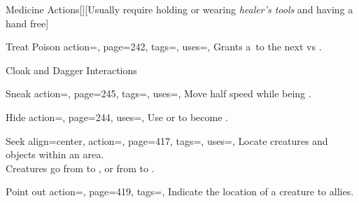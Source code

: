 \begin{PageBackLandscape}
\begin{TablesHalf}{\backTableHeight}
\begin{Table}{Medicine Actions}[][\quad Usually require holding or wearing \textit{healer's tools} and having
        a hand
        free]
            \begin{entry}{Treat Poison}{%
                action=,
                page=242,
                tags=\Manipulate,
                uses={\Medicine[tags={T}]},
            }
                Grants a \,\Cirm to the next  vs .\hfill
            \end{entry}
        \end{Table}
        \TableSpace
        \begin{Table}{Cloak and Dagger Interactions}
            \begin{entry}{Sneak}{%
                action=,
                page=245,
                tags=\Move,
                uses={\Stealth[tags={S}]},
            }
                Move half speed while being \Undetected. \hfill{}\quad
            \end{entry}
            \begin{entry}{Hide}{%
                action=,
                page=244,
                uses={\Stealth[tags={S}]},
            }
                Use  or  to become \Hidden. \hfill
            \end{entry}
            \breakLine
            \begin{entry}{Seek}{%
                align=center,
                action=,
                page=417,
                tags=\Concentrate,
                uses={\Perception[tags={S}]},
            }
                Locate creatures and objects within an area. \hfill
                \\
                Creatures go from \Undetected to \Hidden, or from \Hidden to \Observed.\hfill
            \end{entry}
            \begin{entry}{Point out}{%
                action=,
                page=419,
                tags=\Manipulate,
            }
                Indicate the location of a creature to allies. \Auditory\,\Visual \hfill{}
            \end{entry}

\end{Table}
\end{TablesHalf}
\end{PageBackLandscape}

